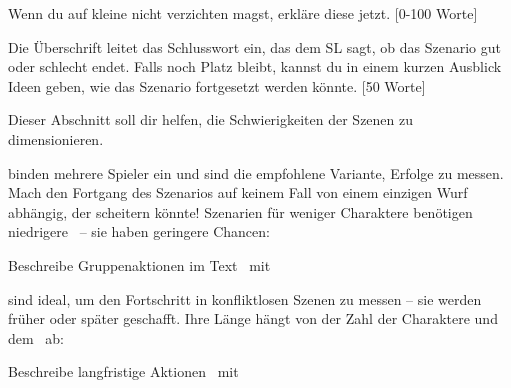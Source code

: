 {		Wenn du auf kleine  nicht verzichten magst, erkläre diese jetzt. [0-100 Worte]

		Die Überschrift  leitet das Schlusswort ein, das dem SL sagt, ob das Szenario gut oder schlecht endet. Falls noch Platz bleibt, kannst du in einem kurzen Ausblick Ideen geben, wie das Szenario fortgesetzt werden könnte. [50 Worte]


		\noindent
		Dieser Abschnitt soll dir helfen, die Schwierigkeiten der Szenen zu dimensionieren.

		 binden mehrere Spieler ein und sind die empfohlene Variante, Erfolge zu messen. Mach den Fortgang des Szenarios auf keinem Fall von einem einzigen Wurf abhängig, der scheitern könnte! Szenarien für weniger Charaktere benötigen niedrigere \TN\ -- sie haben geringere Chancen:


		\noindent
		Beschreibe Gruppenaktionen im Text \zB~mit 

		 sind ideal, um den Fortschritt in konfliktlosen Szenen zu messen -- sie werden früher oder später geschafft. Ihre Länge hängt von der Zahl der Charaktere und dem \TN\ ab:


		\noindent
		Beschreibe langfristige Aktionen \zB~mit 

}
